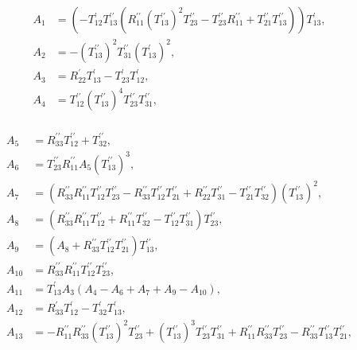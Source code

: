 \documentclass[a4 paper, 12 pt]{extarticle}
\begin{document}
   \[
   \begin{aligned}
   A_1 &= \left(-T_{12}^\prime T_{13}^{\prime\prime} \left(R_{11}^{\prime\prime} (T_{13}^{\prime\prime})^2 T_{23}^{\prime\prime} - T_{23}^{\prime\prime} R_{11}^{\prime\prime} + T_{21}^{\prime\prime} T_{13}^{\prime\prime} \right)\right) T_{13}^\prime, \\
   A_2 &= -(T_{13}^{\prime\prime})^2 T_{31}^{\prime\prime} (T_{13}^\prime)^2, \\
   A_3 &= R_{22}^\prime T_{13}^\prime - T_{23}^\prime T_{12}^\prime, \\
   A_4 &= T_{12}^{\prime\prime} (T_{13}^{\prime\prime})^4 T_{23}^{\prime\prime} T_{31}^{\prime\prime}, \\
   \end{aligned}
   \]
   
   \[
   \begin{aligned}
   A_5 &= R_{33}^{\prime\prime} T_{12}^{\prime\prime} + T_{32}^{\prime\prime}, \\
   A_6 &= T_{23}^{\prime\prime} R_{11}^{\prime\prime} A_5 (T_{13}^{\prime\prime})^3, \\
   A_7 &= \left(R_{33}^{\prime\prime} R_{11}^{\prime\prime} T_{12}^{\prime\prime} T_{23}^{\prime\prime} - R_{33}^{\prime\prime} T_{12}^{\prime\prime} T_{21}^{\prime\prime} + R_{22}^{\prime\prime} T_{31}^{\prime\prime} - T_{21}^{\prime\prime} T_{32}^{\prime\prime}\right)\left(T_{13}^{\prime\prime}\right)^2, \\
   A_8 &= (R_{33}^{\prime\prime} R_{11}^{\prime\prime} T_{12}^{\prime\prime} + R_{11}^{\prime\prime} T_{32}^{\prime\prime} - T_{12}^{\prime\prime} T_{31}^{\prime\prime}) T_{23}^{\prime\prime}, \\
   A_9 &= (A_8 + R_{33}^{\prime\prime} T_{12}^{\prime\prime} T_{21}^{\prime\prime} ) T_{13}^{\prime\prime}, \\
   A_{10} &= R_{33}^{\prime\prime} R_{11}^{\prime\prime} T_{12}^{\prime\prime} T_{23}^{\prime\prime}, \\
   A_{11} &= T_{13}^\prime A_3(A_4-A_6+A_7+A_9-A_{10}), \\
   A_{12} &= R_{33}^\prime T_{12}^\prime - T_{32}^\prime T_{13}^\prime, \\
   A_{13} &= -R_{11}^{\prime\prime} R_{33}^{\prime\prime} (T_{13}^{\prime\prime})^2 T_{23}^{\prime\prime} + (T_{13}^{\prime\prime})^3 T_{23}^{\prime\prime} T_{31}^{\prime\prime} + R_{11}^{\prime\prime} R_{33}^{\prime\prime} T_{23}^{\prime\prime}  - R_{33}^{\prime\prime} T_{13}^{\prime\prime} T_{21}^{\prime\prime}, \\

\end{aligned}\]
\end{document}
